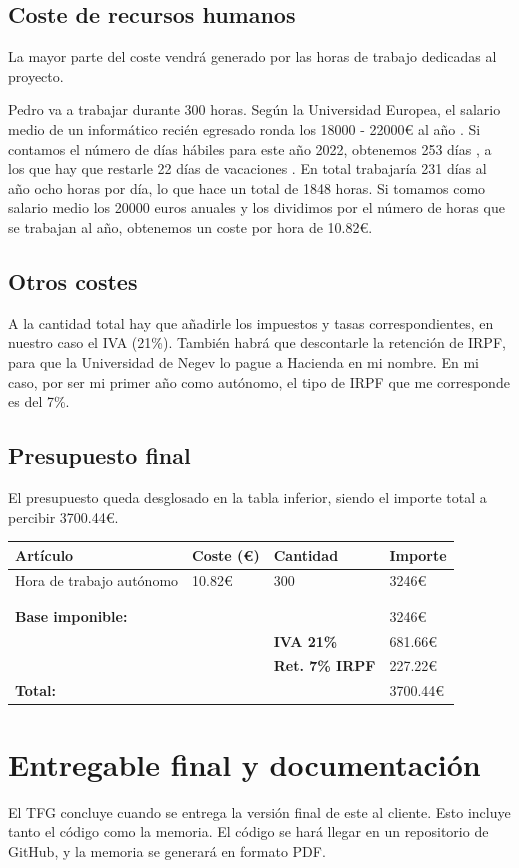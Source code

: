\subsection{Coste de recursos humanos}
La mayor parte del coste vendrá generado por las horas de trabajo dedicadas al proyecto.

Pedro va a trabajar durante 300 horas. Según la Universidad Europea, el salario medio de un informático recién egresado ronda los 18000 - 22000€ al año \cite{salario_ue}. Si contamos el número de días hábiles para este año 2022, obtenemos 253 días \cite{dias_laborables}, a los que hay que restarle 22 días de vacaciones \cite{vacaciones}. En total trabajaría 231 días al año ocho horas por día, lo que hace un total de 1848 horas. Si tomamos como salario medio los 20000 euros anuales y los dividimos por el número de horas que se trabajan al año, obtenemos un coste por hora de 10.82€.

\subsection{Otros costes}
A la cantidad total hay que añadirle los impuestos y tasas correspondientes, en nuestro caso el IVA (21\%). También habrá que descontarle la retención de IRPF, para que la Universidad de Negev lo pague a Hacienda en mi nombre. En mi caso, por ser mi primer año como autónomo, el tipo de IRPF que me corresponde es del 7\%.

\subsection{Presupuesto final}

El presupuesto queda desglosado en la tabla inferior, siendo el importe total a percibir 3700.44€.

\begin{table}[H]
\begin{tabular}{@{}llll@{}}
\toprule
\textbf{Artículo}        & \textbf{Coste (€)} & \textbf{Cantidad}      & \textbf{Importe} \\ \midrule
Hora de trabajo autónomo & 10.82€             & 300                    & 3246€            \\
                            &                    &                        &                  \\
                            &                    &                        &                  \\ \midrule
\textbf{Base imponible:} &                    & \textbf{}              & 3246€            \\
                            &                    & \textbf{IVA 21\%}      & 681.66€          \\
                            &                    & \textbf{Ret. 7\% IRPF} & 227.22€          \\ \midrule
\textbf{Total:}          &                    &                        & 3700.44€        
\end{tabular}
\end{table}

\section{Entregable final y documentación}
El TFG  concluye cuando se entrega la versión final de este al cliente. Esto incluye tanto el código como la memoria. El código se hará llegar en un repositorio de GitHub, y la memoria se generará en formato PDF.